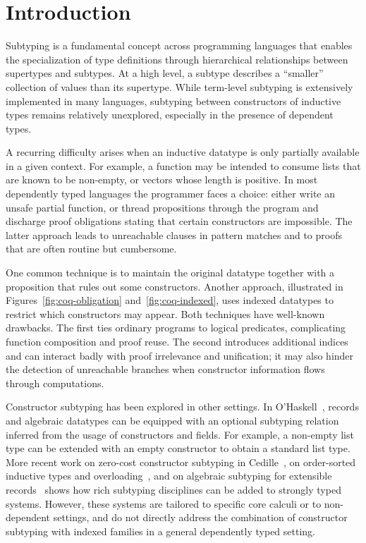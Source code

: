 \documentclass[a4paper, anonymous, UKenglish,cleveref, autoref, thm-restate]{lipics-v2021}
\begin{document}
\section{Introduction}
Subtyping is a fundamental concept across programming languages that enables the specialization of type definitions through hierarchical relationships between supertypes and subtypes. At a high level, a subtype describes a ``smaller'' collection of values than its supertype. While term-level subtyping is extensively implemented in many languages, subtyping between constructors of inductive types remains relatively unexplored, especially in the presence of dependent types.

A recurring difficulty arises when an inductive datatype is only partially available in a given context. For example, a function may be intended to consume lists that are known to be non-empty, or vectors whose length is positive. In most dependently typed languages the programmer faces a choice: either write an unsafe partial function, or thread propositions through the program and discharge proof obligations stating that certain constructors are impossible. The latter approach leads to unreachable clauses in pattern matches and to proofs that are often routine but cumbersome.

One common technique is to maintain the original datatype together with a proposition that rules out some constructors. Another approach, illustrated in Figures~\ref{fig:coq-obligation} and~\ref{fig:coq-indexed}, uses indexed datatypes to restrict which constructors may appear. Both techniques have well-known drawbacks. The first ties ordinary programs to logical predicates, complicating function composition and proof reuse. The second introduces additional indices and can interact badly with proof irrelevance and unification; it may also hinder the detection of unreachable branches when constructor information flows through computations.

Constructor subtyping has been explored in other settings. In O'Haskell~\cite{Nordlander987777}, records and algebraic datatypes can be equipped with an optional subtyping relation inferred from the usage of constructors and fields. For example, a non-empty list type can be extended with an empty constructor to obtain a standard list type. More recent work on zero-cost constructor subtyping in Cedille~\cite{MarmadukeJenkinsStump,jenkins2019elaborating}, on order-sorted inductive types and overloading~\cite{BatheGillesFradeMaria,barthe}, and on algebraic subtyping for extensible records~\cite{MarquesFloridoVasconcelos2024} shows how rich subtyping disciplines can be added to strongly typed systems. However, these systems are tailored to specific core calculi or to non-dependent settings, and do not directly address the combination of constructor subtyping with indexed families in a general dependently typed setting.
\end{document}
